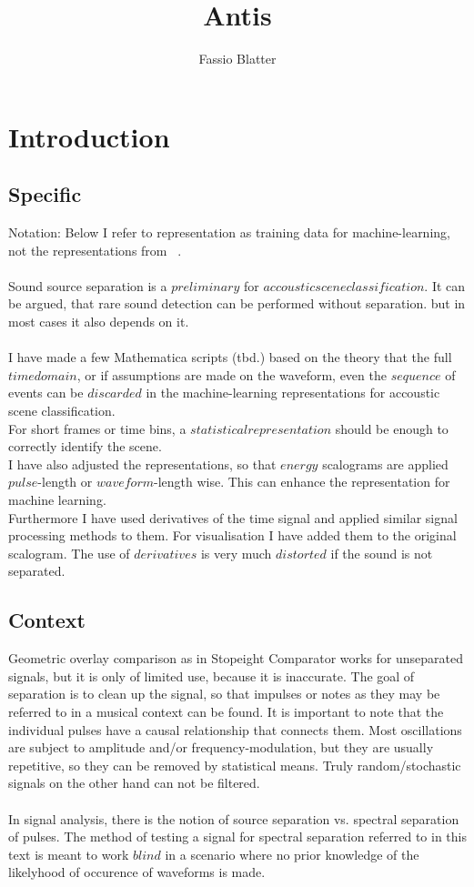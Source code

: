 \documentclass{report}
\begin{document}
\title{Antis}
\author{Fassio Blatter}
\maketitle

\chapter{Introduction}
\section{Specific}
Notation: Below I refer to representation as training data for machine-learning, not the representations from ~\cite[Spline\_Axioms.tex]{Axioms}.\\\\
Sound source separation is a $preliminary$ for $accoustic scene classification$. It can be argued, that rare sound detection can be performed without separation. but in most cases it also depends on it.\\\\
I have made a few Mathematica scripts (tbd.) based on the theory that the full $time domain$, or if assumptions are made on the waveform, even the $sequence$ of events can be $discarded$ in the machine-learning representations for accoustic scene classification.\\
For short frames or time bins, a $statistical representation$ should be enough to correctly identify the scene.\\
I have also adjusted the representations, so that $energy$ scalograms are applied $pulse$-length or $waveform$-length wise. This can enhance the representation for machine learning.\\
Furthermore I have used derivatives of the time signal and applied similar signal processing methods to them. For visualisation I have added them to the original scalogram. The use of $derivatives$ is very much $distorted$ if the sound is not separated.
\section{Context}
Geometric overlay comparison as in Stopeight Comparator works for unseparated signals, but it is only of limited use, because it is inaccurate. The goal of separation is to clean up the signal, so that impulses or notes as they may be referred to in a musical context can be found. It is important to note that the individual pulses have a causal relationship that connects them. Most oscillations are subject to amplitude and/or frequency-modulation, but they are usually repetitive, so they can be removed by statistical means. Truly random/stochastic signals on the other hand can not be filtered.\\\\
In signal analysis, there is the notion of source separation vs. spectral separation of pulses. The method of testing a signal for spectral separation referred to in this text is meant to work $blind$ in a scenario where no prior knowledge of the likelyhood of occurence of waveforms is made.
\end{document}
